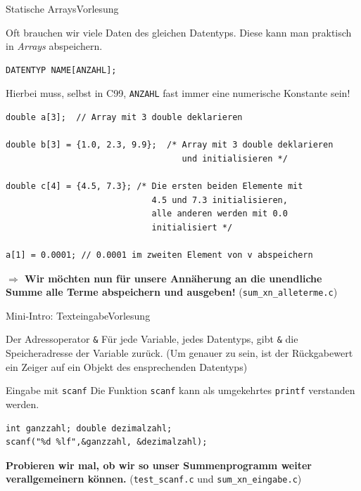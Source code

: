 \documentclass[xcolor=dvipsnames]{beamer}
\newcounter{lecturecounter}
\begin{document}
\begin{frame}[fragile]{Statische Arrays}{Vorlesung }
  \begin{block}{}
    Oft brauchen wir viele Daten des gleichen Datentyps. Diese kann man praktisch in \emph{Arrays} abspeichern.
  \end{block}

\begin{lstlisting}
DATENTYP NAME[ANZAHL];
\end{lstlisting}
Hierbei muss, selbst in C99, \texttt{ANZAHL} fast immer eine numerische Konstante sein!

\begin{lstlisting}
double a[3];  // Array mit 3 double deklarieren

double b[3] = {1.0, 2.3, 9.9};  /* Array mit 3 double deklarieren
                                   und initialisieren */

double c[4] = {4.5, 7.3}; /* Die ersten beiden Elemente mit 
                             4.5 und 7.3 initialisieren,
                             alle anderen werden mit 0.0 
                             initialisiert */
                                   
a[1] = 0.0001; // 0.0001 im zweiten Element von v abspeichern
\end{lstlisting}
\textbf{$\Rightarrow$ Wir möchten nun für unsere Annäherung an die unendliche Summe alle Terme abspeichern und ausgeben!} (\verb|sum_xn_alleterme.c|)
\end{frame}

\begin{frame}[fragile]{Mini-Intro: Texteingabe}{Vorlesung }
\begin{block}{Der Adressoperator \texttt{\&}}
  Für jede Variable, jedes Datentyps, gibt \texttt{\&} die Speicheradresse der Variable zurück. (Um genauer zu sein, ist der Rückgabewert ein Zeiger auf ein Objekt des ensprechenden Datentyps)
\end{block}
\begin{block}{Eingabe mit \texttt{scanf}}
  Die Funktion \texttt{scanf} kann als umgekehrtes \texttt{printf} verstanden werden.
\end{block}
\begin{lstlisting}
int ganzzahl; double dezimalzahl;
scanf("%d %lf",&ganzzahl, &dezimalzahl);
\end{lstlisting}
\textbf{Probieren wir mal, ob wir so unser Summenprogramm weiter verallgemeinern können.} (\verb|test_scanf.c| und \verb|sum_xn_eingabe.c|)
\end{frame}
\end{document}

